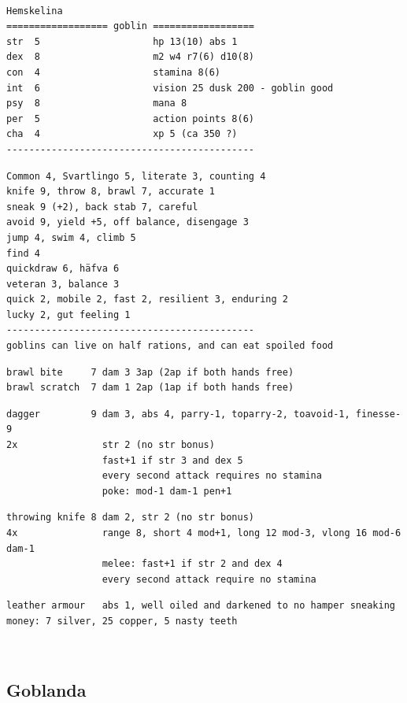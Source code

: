 \

\goodbreak \small \begin{samepage} \begin{verbatim}
Hemskelina
================== goblin ==================
str  5                    hp 13(10) abs 1
dex  8                    m2 w4 r7(6) d10(8)
con  4                    stamina 8(6)
int  6                    vision 25 dusk 200 - goblin good
psy  8                    mana 8
per  5                    action points 8(6)
cha  4                    xp 5 (ca 350 ?)
--------------------------------------------
\end{verbatim} \goodbreak \begin{verbatim}
Common 4, Svartlingo 5, literate 3, counting 4
knife 9, throw 8, brawl 7, accurate 1
sneak 9 (+2), back stab 7, careful
avoid 9, yield +5, off balance, disengage 3
jump 4, swim 4, climb 5
find 4
quickdraw 6, häfva 6
veteran 3, balance 3
quick 2, mobile 2, fast 2, resilient 3, enduring 2
lucky 2, gut feeling 1
--------------------------------------------
goblins can live on half rations, and can eat spoiled food
\end{verbatim} \goodbreak \begin{verbatim}
brawl bite     7 dam 3 3ap (2ap if both hands free)
brawl scratch  7 dam 1 2ap (1ap if both hands free)
\end{verbatim} \goodbreak \begin{verbatim}
dagger         9 dam 3, abs 4, parry-1, toparry-2, toavoid-1, finesse-9
2x               str 2 (no str bonus)
                 fast+1 if str 3 and dex 5
                 every second attack requires no stamina
                 poke: mod-1 dam-1 pen+1
\end{verbatim} \goodbreak \begin{verbatim}
throwing knife 8 dam 2, str 2 (no str bonus)
4x               range 8, short 4 mod+1, long 12 mod-3, vlong 16 mod-6 dam-1
                 melee: fast+1 if str 2 and dex 4
                 every second attack require no stamina
\end{verbatim} \goodbreak \begin{verbatim}
leather armour   abs 1, well oiled and darkened to no hamper sneaking
money: 7 silver, 25 copper, 5 nasty teeth
\end{verbatim} \end{samepage} \normalsize



\

\subsection*{Goblanda}

